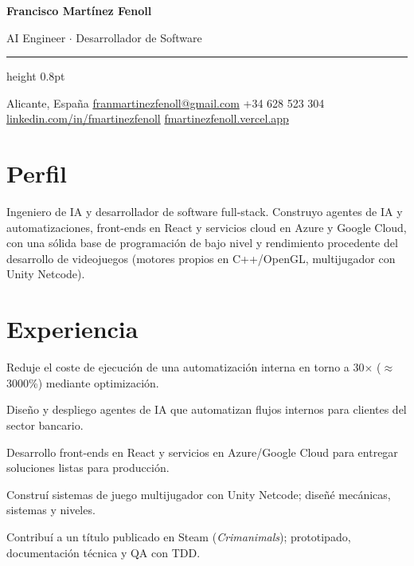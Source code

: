 \documentclass[10pt,a4paper]{article}
\begin{document}
{\centering \Huge\bfseries Francisco Mart\'inez Fenoll \par}
\vspace{2pt}
{\centering \large AI Engineer $\cdot$ Desarrollador de Software \par}
\vspace{3pt}
\hrule height 0.8pt
\vspace{4pt}
{\centering \small
Alicante, Espa\~na \textbullet{}
\href{mailto:franmartinezfenoll@gmail.com}{franmartinezfenoll@gmail.com} \textbullet{}
+34 628 523 304 \textbullet{}
\href{https://www.linkedin.com/in/fmartinezfenoll}{linkedin.com/in/fmartinezfenoll} \textbullet{}
\href{https://fmartinezfenoll.vercel.app}{fmartinezfenoll.vercel.app}
\par}

\section{Perfil}
Ingeniero de IA y desarrollador de software full-stack. Construyo agentes de IA y automatizaciones, front-ends en React y servicios cloud en Azure y Google Cloud, con una s\'olida base de programaci\'on de bajo nivel y rendimiento procedente del desarrollo de videojuegos (motores propios en C++/OpenGL, multijugador con Unity Netcode).

\section{Experiencia}

\begin{cvitems}
  \item Reduje el coste de ejecuci\'on de una automatizaci\'on interna en torno a 30$\times$ ($\approx$3000\%) mediante optimizaci\'on.
  \item Dise\~no y despliego agentes de IA que automatizan flujos internos para clientes del sector bancario.
  \item Desarrollo front-ends en React y servicios en Azure/Google Cloud para entregar soluciones listas para producci\'on.
\end{cvitems}
\entrygap

\begin{cvitems}
  \item Constru\'i sistemas de juego multijugador con Unity Netcode; dise\~n\'e mec\'anicas, sistemas y niveles.
  \item Contribu\'i a un t\'itulo publicado en Steam (\textit{Crimanimals}); prototipado, documentaci\'on t\'ecnica y QA con TDD.
\end{cvitems}
\entrygap
\end{document}
